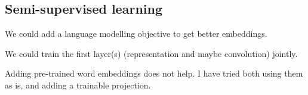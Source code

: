 \documentclass[10pt,a4paper]{article}
\begin{document}
\subsection{Semi-supervised learning}

We could add a language modelling objective to get better embeddings.

We could train the first layer(s) (representation and maybe convolution) jointly.

Adding pre-trained word embeddings does not help. I have tried both using them as is, and adding a trainable projection.

\nocite{*}
{}

\end{document}
